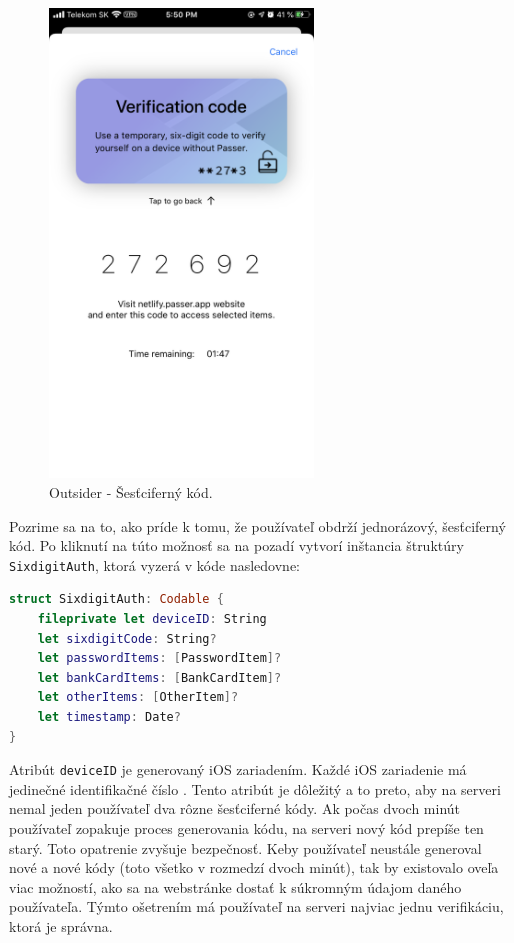 \begin{figure}[H]
  \centering
  \includegraphics[width=7cm]{img/passer9.PNG}
  \caption{Outsider - Šesťciferný kód.}
  \label{passer9}
\end{figure}

Pozrime sa na to, ako príde k tomu, že používateľ obdrží jednorázový, šesťciferný kód. Po kliknutí na túto možnosť sa na pozadí vytvorí inštancia štruktúry \texttt{SixdigitAuth}, ktorá vyzerá v kóde nasledovne:
\newline
\begin{lstlisting}[language=Swift, basicstyle=\small]
struct SixdigitAuth: Codable {
    fileprivate let deviceID: String
    let sixdigitCode: String?
    let passwordItems: [PasswordItem]?
    let bankCardItems: [BankCardItem]?
    let otherItems: [OtherItem]?
    let timestamp: Date?
}
\end{lstlisting}
\leavevmode\newline

Atribút \texttt{deviceID} je generovaný iOS zariadením. Každé iOS zariadenie má jedinečné identifikačné číslo \cite{iOS_id}. Tento atribút je dôležitý a to preto, aby na serveri nemal jeden používateľ dva rôzne šesťciferné kódy. Ak počas dvoch minút používateľ zopakuje proces generovania kódu, na serveri nový kód prepíše ten starý. Toto opatrenie zvyšuje bezpečnosť. Keby používateľ neustále generoval nové a nové kódy (toto všetko v rozmedzí dvoch minút), tak by existovalo oveľa viac možností, ako sa na webstránke dostať k súkromným údajom daného používateľa. Týmto ošetrením má používateľ na serveri najviac jednu verifikáciu, ktorá je správna.

